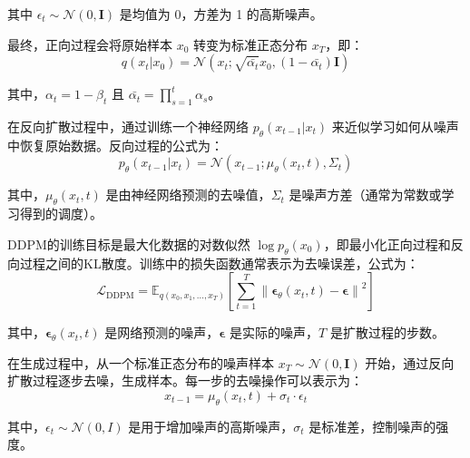 \documentclass[promaster]{thesis-uestc}
\begin{document}
其中 \( \epsilon_t \sim \mathcal{N}(0, \mathbf{I}) \) 是均值为 0，方差为 1 的高斯噪声。

最终，正向过程会将原始样本 \( x_0 \) 转变为标准正态分布 \( x_T \)，即：
\begin{equation}
q(x_t | x_0) = \mathcal{N}(x_t; \sqrt{\bar{\alpha_t}} x_0, (1 - \bar{\alpha_t}) \mathbf{I})
\end{equation}

其中，\( \alpha_t = 1 - \beta_t \) 且 \( \bar{\alpha_t} = \prod_{s=1}^t \alpha_s \)。



在反向扩散过程中，通过训练一个神经网络 \( p_{\theta}(x_{t-1} | x_t) \) 来近似学习如何从噪声中恢复原始数据。反向过程的公式为：
\begin{equation}
p_{\theta}(x_{t-1} | x_t) = \mathcal{N}(x_{t-1}; \mu_{\theta}(x_t, t), \Sigma_t)
\end{equation}

其中，\( \mu_{\theta}(x_t, t) \) 是由神经网络预测的去噪值，\( \Sigma_t \) 是噪声方差（通常为常数或学习得到的调度）。



DDPM的训练目标是最大化数据的对数似然 \( \log p_{\theta}(x_0) \)，即最小化正向过程和反向过程之间的KL散度。训练中的损失函数通常表示为去噪误差，公式为：
\begin{equation}
\mathcal{L}_{\text{DDPM}} = \mathbb{E}_{q(x_0, x_1, \dots, x_T)} \left[ \sum_{t=1}^{T} \left\| \mathbf{\epsilon}_\theta(x_t, t) - \mathbf{\epsilon} \right\|^2 \right]
\end{equation}

其中，\( \mathbf{\epsilon}_\theta(x_t, t) \) 是网络预测的噪声，\( \mathbf{\epsilon} \) 是实际的噪声，\( T \) 是扩散过程的步数。



在生成过程中，从一个标准正态分布的噪声样本 \( x_T \sim \mathcal{N}(0, \mathbf{I}) \) 开始，通过反向扩散过程逐步去噪，生成样本。每一步的去噪操作可以表示为：
\begin{equation}
x_{t-1} = \mu_{\theta}(x_t, t) + \sigma_t \cdot \epsilon_t
\end{equation}

其中，\( \epsilon_t \sim \mathcal{N}(0, I) \) 是用于增加噪声的高斯噪声，\( \sigma_t \) 是标准差，控制噪声的强度。
\end{document}
